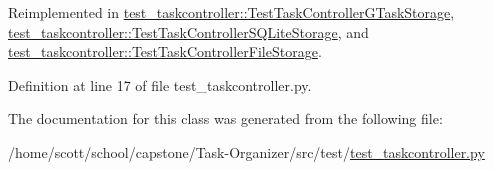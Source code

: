 \-Reimplemented in \hyperlink{classtest__taskcontroller_1_1TestTaskControllerGTaskStorage_afac8474c0938bce8e9ffa5c809d65e7a}{test\-\_\-taskcontroller\-::\-Test\-Task\-Controller\-G\-Task\-Storage}, \hyperlink{classtest__taskcontroller_1_1TestTaskControllerSQLiteStorage_a3fcf0960dcbb4eb0c910638fc6789480}{test\-\_\-taskcontroller\-::\-Test\-Task\-Controller\-S\-Q\-Lite\-Storage}, and \hyperlink{classtest__taskcontroller_1_1TestTaskControllerFileStorage_a4e8286cf16ac1c8751a710a36785aa69}{test\-\_\-taskcontroller\-::\-Test\-Task\-Controller\-File\-Storage}.



\-Definition at line 17 of file test\-\_\-taskcontroller.\-py.



\-The documentation for this class was generated from the following file\-:\begin{DoxyCompactItemize}
\item 
/home/scott/school/capstone/\-Task-\/\-Organizer/src/test/\hyperlink{test__taskcontroller_8py}{test\-\_\-taskcontroller.\-py}\end{DoxyCompactItemize}

